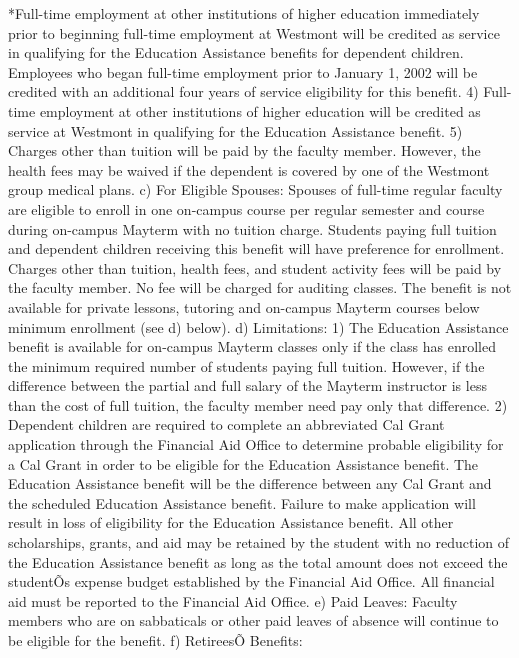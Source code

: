\documentclass[letterpaper, 11pt]{article}
\begin{document}
   *Full-time employment at other institutions of higher education immediately prior to beginning full-time employment at Westmont will be credited as service in qualifying for the Education Assistance benefits for dependent children.  Employees who began full-time employment prior to January 1, 2002 will be credited with an additional four years of service eligibility for this benefit.
4) Full-time employment at other institutions of higher education will be credited as service at Westmont in qualifying for the Education Assistance benefit.
5) Charges other than tuition will be paid by the faculty member.  However, the health fees may be waived if the dependent is covered by one of the Westmont group medical plans.
c) For Eligible Spouses:
   Spouses of full-time regular faculty are eligible to enroll in one on-campus course per regular semester and course during on-campus Mayterm with no tuition charge.  Students paying full tuition and dependent children receiving this benefit will have preference for enrollment.  Charges other than tuition, health fees, and student activity fees will be paid by the faculty member.  No fee will be charged for auditing classes.  The benefit is not available for private lessons, tutoring and on-campus Mayterm courses below minimum enrollment (see d) below).
d) Limitations:
1) The Education Assistance benefit is available for on-campus Mayterm classes only if the class has enrolled the minimum required number of students paying full tuition.  However, if the difference between the partial and full salary of the Mayterm instructor is less than the cost of full tuition, the faculty member need pay only that difference.
2) Dependent children are required to complete an abbreviated Cal Grant application through the Financial Aid Office to determine probable eligibility for a Cal Grant in order to be eligible for the Education Assistance benefit.  The Education Assistance benefit will be the difference between any Cal Grant and the scheduled Education Assistance benefit.  Failure to make application will result in loss of eligibility for the Education Assistance benefit.  All other scholarships, grants, and aid may be retained by the student with no reduction of the Education Assistance benefit as long as the total amount does not exceed the studentÕs expense budget established by the Financial Aid Office.  All financial aid must be reported to the Financial Aid Office.
e) Paid Leaves:
   Faculty members who are on sabbaticals or other paid leaves of absence will continue to be eligible for the benefit.
f) RetireesÕ Benefits:
\end{document}
